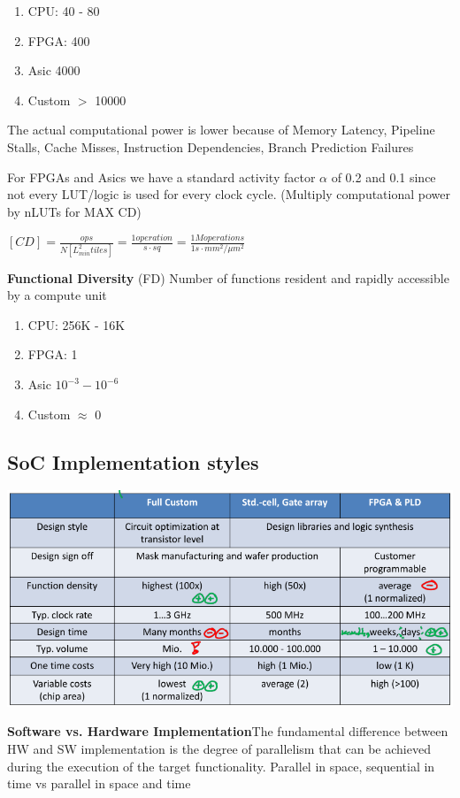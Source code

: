 \documentclass[english]{latex4ei/latex4ei_sheet}
\begin{document}
\begin{enumerate}
	\item CPU: 40 - 80
	\item FPGA: 400
	\item Asic 4000
	\item Custom  $>$ 10000
\end{enumerate}

The actual computational power is lower because of Memory Latency, Pipeline Stalls, Cache Misses, Instruction Dependencies, Branch Prediction Failures

For FPGAs and Asics we have a standard activity factor $\alpha$ of 0.2 and 0.1 since not every LUT/logic is used for every clock cycle. (Multiply computational power by nLUTs for MAX CD)

$[CD] = \frac{ops}{N [L_{min}^2 tiles]} = \frac{1 operation}{s \cdot sq}
	= \frac{1M operations}{1s \cdot mm^2 / \mu m^2}$

\textbf{Functional Diversity} (FD) Number of functions resident and rapidly accessible by a compute unit

\begin{enumerate}
	\item CPU: 256K - 16K
	\item FPGA: 1
	\item Asic $10^{-3}  - 10^{-6}$
	\item Custom  $\approx$ 0
\end{enumerate}

\subsection{SoC Implementation styles}
\begin{center}
  \centering
  \includegraphics[width=\linewidth]{assets/HWImplementation.png}
  \label{fig:hwimplementation}
\end{center}
\textbf{Software vs. Hardware Implementation}The fundamental difference between HW and SW implementation is the degree of parallelism that can be achieved during the execution of the target functionality. Parallel in space, sequential in time vs parallel in space and time
\end{document}
